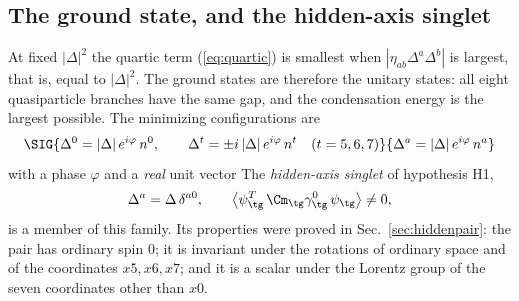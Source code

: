 \subsection{The ground state, and the hidden-axis singlet}
\label{sec:ground}

At fixed $|\Delta|^2$ the quartic term (\ref{eq:quartic}) is smallest when
$|\eta_{ab}\Delta^a\Delta^b|$ is largest, that is, equal to $|\Delta|^2$. The ground states are
therefore the unitary states: all eight quasiparticle branches have the same gap, and the
condensation energy is the largest possible. The minimizing configurations are
\begin{equation}
\SIG{\Delta^0=|\Delta|\,e^{i\varphi}\,n^0,\qquad\Delta^t=\pm i\,|\Delta|\,e^{i\varphi}\,n^t\quad(t=5,6,7)}{\Delta^a=|\Delta|\,e^{i\varphi}\,n^a}
\label{eq:groundstates}
\end{equation}
with a phase $\varphi$ and a \emph{real} unit vector
 The \emph{hidden-axis singlet} of hypothesis H1,
\begin{equation}
\Delta^a=\Delta\,\delta^{a0},\qquad\big\langle\psi_{\tg}^T\,\Cm_{\tg}\gamma_{\tg}^0\,\psi_{\tg}\big\rangle\neq0,
\label{eq:singlet}
\end{equation}
is a member of this family. Its properties were proved in Sec.~\ref{sec:hiddenpair}: the pair has
ordinary spin 0; it is invariant under the rotations of ordinary space and of the coordinates
$x5,x6,x7$; and it is a scalar under the Lorentz group of the seven coordinates other than $x0$.


